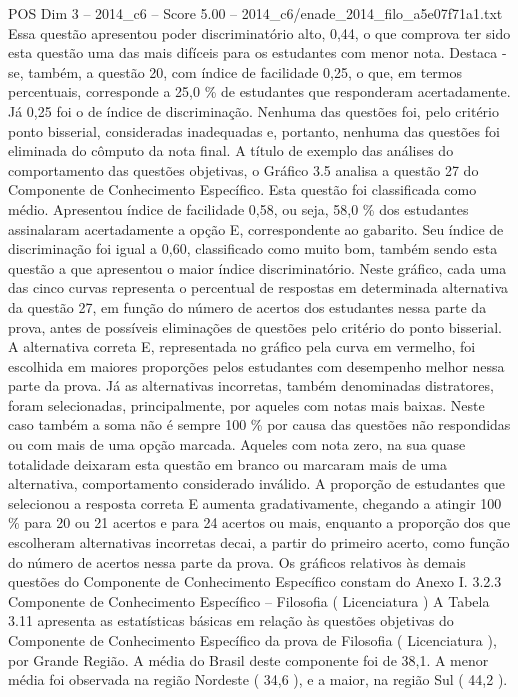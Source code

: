 \begin{textsample}{POS Dim 3 – 2014\_c6 – Score 5.00 – 2014\_c6/enade\_2014\_filo\_a5e07f71a1.txt}
Essa questão apresentou poder discriminatório alto, 0,44, o que comprova ter sido esta questão uma das mais difíceis para os estudantes com menor nota.
Destaca -se, também, a questão 20, com índice de facilidade 0,25, o que, em termos percentuais, corresponde a 25,0 \% de estudantes que responderam acertadamente.
Já 0,25 foi o de índice de discriminação.
Nenhuma das questões foi, pelo critério ponto bisserial, consideradas inadequadas e, portanto, nenhuma das questões foi eliminada do cômputo da nota final.
A título de exemplo das análises do comportamento das questões objetivas, o Gráfico 3.5 analisa a questão 27 do Componente de Conhecimento Específico.
Esta questão foi classificada como médio.
Apresentou índice de facilidade 0,58, ou seja, 58,0 \% dos estudantes assinalaram acertadamente a opção E, correspondente ao gabarito.
Seu índice de discriminação foi igual a 0,60, classificado como muito bom, também sendo esta questão a que apresentou o maior índice discriminatório.
Neste gráfico, cada uma das cinco curvas representa o percentual de respostas em determinada alternativa da questão 27, em função do número de acertos dos estudantes nessa parte da prova, antes de possíveis eliminações de questões pelo critério do ponto bisserial.
A alternativa correta E, representada no gráfico pela curva em vermelho, foi escolhida em maiores proporções pelos estudantes com desempenho melhor nessa parte da prova.
Já as alternativas incorretas, também denominadas distratores, foram selecionadas, principalmente, por aqueles com notas mais baixas.
Neste caso também a soma não é sempre 100 \% por causa das questões não respondidas ou com mais de uma opção marcada.
Aqueles com nota zero, na sua quase totalidade deixaram esta questão em branco ou marcaram mais de uma alternativa, comportamento considerado inválido.
A proporção de estudantes que selecionou a resposta correta E aumenta gradativamente, chegando a atingir 100 \% para 20 ou 21 acertos e para 24 acertos ou mais, enquanto a proporção dos que escolheram alternativas incorretas decai, a partir do primeiro acerto, como função do número de acertos nessa parte da prova.
Os gráficos relativos às demais questões do Componente de Conhecimento Específico constam do Anexo I. 3.2.3 Componente de Conhecimento Específico – Filosofia ( Licenciatura ) A Tabela 3.11 apresenta as estatísticas básicas em relação às questões objetivas do Componente de Conhecimento Específico da prova de Filosofia ( Licenciatura ), por Grande Região.
A média do Brasil deste componente foi de 38,1.
A menor média foi observada na região Nordeste ( 34,6 ), e a maior, na região Sul ( 44,2 ).

\end{textsample}
